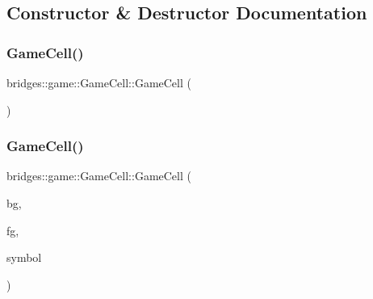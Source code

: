 \subsection{Constructor \& Destructor Documentation}
\mbox{\label{classbridges_1_1game_1_1_game_cell_a750114853f2f0f7519cb663352230868}} 
\subsubsection{\texorpdfstring{Game\+Cell()}{GameCell()}\hspace{0.1cm}{\footnotesize\ttfamily [1/2]}}
{\footnotesize\ttfamily bridges\+::game\+::\+Game\+Cell\+::\+Game\+Cell (\begin{DoxyParamCaption}{ }\end{DoxyParamCaption})\hspace{0.3cm}{\ttfamily [inline]}}

\mbox{\label{classbridges_1_1game_1_1_game_cell_a743b618fc8553aa9aac33ddc3bb65a79}} 
\subsubsection{\texorpdfstring{Game\+Cell()}{GameCell()}\hspace{0.1cm}{\footnotesize\ttfamily [2/2]}}
{\footnotesize\ttfamily bridges\+::game\+::\+Game\+Cell\+::\+Game\+Cell (\begin{DoxyParamCaption}\item[{\hyperlink{namespacebridges_1_1game_afaa832a4322b25b6a4ebfba832f10f26}{Named\+Color}}]{bg,  }\item[{\hyperlink{namespacebridges_1_1game_afaa832a4322b25b6a4ebfba832f10f26}{Named\+Color}}]{fg,  }\item[{\hyperlink{namespacebridges_1_1game_ab9a19c7ab6e2ebac2f95180e21733487}{Named\+Symbol}}]{symbol }\end{DoxyParamCaption})\hspace{0.3cm}{\ttfamily [inline]}}



